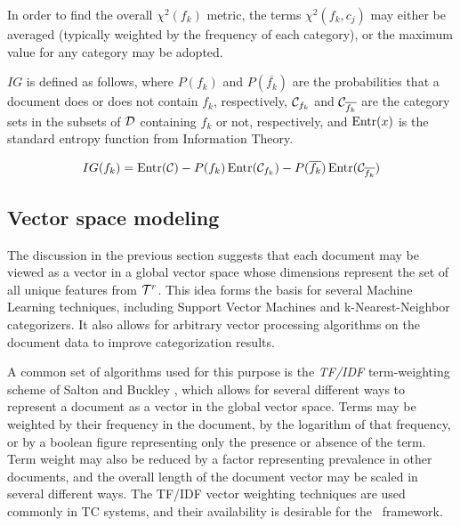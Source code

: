 In order to find the overall $\chi^2(f_k)$ metric, the terms
$\chi^2(f_k,c_j)$ may either be averaged (typically weighted by the
frequency of each category), or the maximum value for any category may
be adopted.\cite{yang:97}

$IG$ is defined as follows, where $P(f_k)$ and $P(\overline{f_k})$ are
the probabilities that a document does or does not contain $f_k$,
respectively, $\mathcal{C}_{f_k}$ and $\mathcal{C}_{\overline{f_k}}$ are the
category sets in the subsets of $\mathcal{D}$ containing $f_k$ or not,
respectively, and $\operatorname{Entr}(x)$ is the standard entropy function from
Information Theory. \cite[ch. 2]{manning:99}

\begin{equation*}
        IG(f_k) = \operatorname{Entr}(\mathcal{C})
                  - P(f_k) \operatorname{Entr}(\mathcal{C}_{f_k})
	          - P(\overline{f_k}) \operatorname{Entr}(\mathcal{C}_{\overline{f_k}})
\end{equation*}


\subsection{Vector space modeling}

The discussion in the previous section suggests that each document may
be viewed as a vector in a global vector space whose dimensions
represent the set of all unique features from $\mathcal{T}^r$.  This idea
forms the basis for several Machine Learning techniques, including
Support Vector Machines and k-Nearest-Neighbor categorizers.  It also
allows for arbitrary vector processing algorithms on the document data
to improve categorization results.

A common set of algorithms used for this purpose is the \emph{TF/IDF}
term-weighting scheme of Salton and Buckley \cite{salton:88}, which
allows for several different ways to represent a document as a vector
in the global vector space.  Terms may be weighted by their frequency
in the document, by the logarithm of that frequency, or by a boolean
figure representing only the presence or absence of the term.  Term
weight may also be reduced by a factor representing prevalence in
other documents, and the overall length of the document vector may be
scaled in several different ways.  The TF/IDF vector weighting
techniques are used commonly in TC systems, and their availability is
desirable for the \aicat\ framework.

